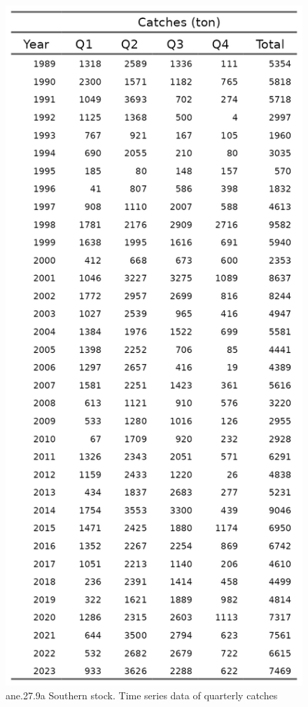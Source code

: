 \documentclass[
]{article}
\begin{document}
\begin{figure}[H]

{\centering \includegraphics[width=0.95\linewidth]{report/run/S1.0_4FLEETS_SelECO_RecIndex_Mnewfix/tb_catches} 

}

\caption{ane.27.9a Southern stock. Time series data of quarterly catches }\label{fig:unnamed-chunk-4}
\end{figure}
\end{document}

